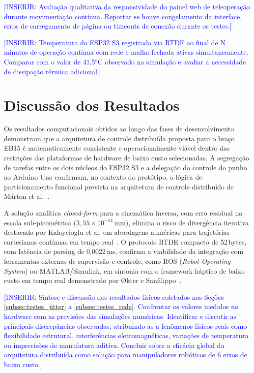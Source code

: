 \textcolor{blue}{[INSERIR: Avaliação qualitativa da responsividade do painel web de teleoperação durante movimentação contínua. Reportar se houve congelamento da interface, erros de carregamento de página ou timeouts de conexão durante os testes.]}

\textcolor{blue}{[INSERIR: Temperatura do ESP32 S3 registrada via RTDE ao final de N minutos de operação contínua com rede e malha fechada ativas simultaneamente. Comparar com o valor de 41,5°C observado na simulação e avaliar a necessidade de dissipação térmica adicional.]}

\section{Discussão dos Resultados}
\label{sec:discussao}

Os resultados computacionais obtidos ao longo das fases de desenvolvimento demonstram que a arquitetura de controle distribuída proposta para o braço EB15 é matematicamente consistente e operacionalmente viável dentro das restrições das plataformas de hardware de baixo custo selecionadas. A segregação de tarefas entre os dois núcleos do ESP32 S3 e a delegação do controle do punho ao Arduino Uno confirmam, no contexto do protótipo, a lógica de particionamento funcional prevista na arquitetura de controle distribuído de Márton et al.~\cite{marton2009distributed}.

A solução analítica \textit{closed-form} para a cinemática inversa, com erro residual na escala sub-picométrica ($3{,}55 \times 10^{-14}\,\text{mm}$), elimina o risco de divergência iterativa destacado por Kalaycioglu et al. em abordagens numéricas para trajetórias cartesianas contínuas em tempo real~\cite{kalaycioglu2024analytical}. O protocolo RTDE compacto de 52\,bytes, com latência de parsing de 0,0022\,ms, confirma a viabilidade da integração com ferramentas externas de supervisão e controle, como ROS (\textit{Robot Operating System}) ou MATLAB/Simulink, em sintonia com o framework háptico de baixo custo em tempo real demonstrado por Økter e Sanfilippo~\cite{okter2025ros}.

\textcolor{blue}{[INSERIR: Síntese e discussão dos resultados físicos coletados nas Seções \ref{subsec:testes_jitter} a \ref{subsec:testes_rede}. Confrontar os valores medidos no hardware com as previsões das simulações numéricas. Identificar e discutir as principais discrepâncias observadas, atribuindo-as a fenômenos físicos reais como flexibilidade estrutural, interferências eletromagnéticas, variações de temperatura ou imprecisões de manufatura aditiva. Concluir sobre a eficácia global da arquitetura distribuída como solução para manipuladores robóticos de 6 eixos de baixo custo.]}
